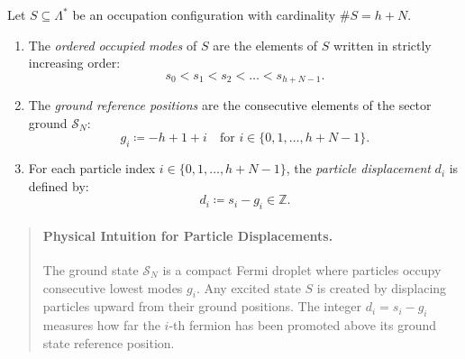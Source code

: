\begin{definition}
Let $S \subseteq \Lambda^*$ be an occupation configuration with cardinality $\#S = h + N$.
\begin{enumerate}
    \item The \emph{ordered occupied modes} of $S$ are the elements of $S$ written in strictly increasing order:
    \begin{equation}
    s_0 < s_1 < s_2 < \dots < s_{h+N-1}.
    \end{equation}
    \item The \emph{ground reference positions} are the consecutive elements of the sector ground $\mathcal{S}_N$:
    \begin{equation}
    g_i \coloneqq -h + 1 + i \quad \text{for } i \in \{0, 1, \dots, h+N-1\}.
    \end{equation}
    \item For each particle index $i \in \{0, 1, \dots, h+N-1\}$, the \emph{particle displacement} $d_i$ is defined by:
    \begin{equation}
    d_i \coloneqq s_i - g_i \in \mathbb{Z}.
    \end{equation}
\end{enumerate}
\end{definition}

\begin{quote}
\item[]\paragraph{Physical Intuition for Particle Displacements.}
The ground state $\mathcal{S}_N$ is a compact Fermi droplet where particles occupy consecutive lowest modes $g_i$. Any excited state $S$ is created by displacing particles upward from their ground positions. The integer $d_i = s_i - g_i$ measures how far the $i$-th fermion has been promoted above its ground state reference position.
\end{quote}

